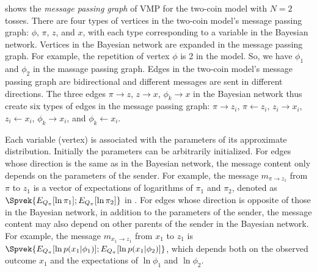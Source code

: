  shows the \emph{message passing graph} of
VMP for the two-coin model with $N=2$ tosses.
There are four types of vertices in the two-coin model's message passing graph: $\phi$, $\pi$, $z$, and $x$, 
with each type corresponding to a variable in the Bayesian network.
Vertices in the Bayesian network are expanded in the message passing graph.
For example, the repetition of vertex $\phi$ is 2 in the model.
So, we have $\phi_1$ and $\phi_2$ in the massage passing graph.
Edges in the two-coin model's message passing graph are bidirectional
and different messages are sent in different directions.
The three edges $\pi \rightarrow z$, 
$z \rightarrow x$, $\phi_k \rightarrow x$ in the Bayesian network
thus create six types of edges in the message passing graph:
$\pi \rightarrow z_i$, 
$\pi \leftarrow z_i$, 
$z_i \rightarrow x_i$, 
$z_i \leftarrow x_i$, 
$\phi_k \rightarrow x_i$, and
$\phi_k \leftarrow x_i$.

 


Each variable (vertex) is associated with the parameters of its
approximate distribution. Initially the parameters can be arbitrarily
initialized. For edges whose direction is the same as in the Bayesian network,
the message content only depends on the parameters of the sender.  
For example, the
message $m_{\pi \rightarrow z_1}$ from $\pi$ to $z_1$ is a vector of expectations of logarithms of
$\pi_1$ and $\pi_2$,
denoted as $\Spvek{E_{Q_\pi}[\ln \pi_1];E_{Q_\pi}[\ln \pi_2]}$ in .
For edges whose direction is opposite of those in the
Bayesian network, %
in addition to the parameters of the sender, 
the message content may also depend on other parents of the sender in the Bayesian network. 
For example, the message $m_{x_1 \rightarrow z_1}$ from $x_1$ to $z_1$ is
$\Spvek{E_{Q_\pi}[\ln p(x_1 | \phi_1)];E_{Q_\pi}[\ln p(x_1 | \phi_2)]}$,
which depends both on the observed outcome $x_1$ and the
expectations of $\ln \phi_1$ and $\ln \phi_2$.  

